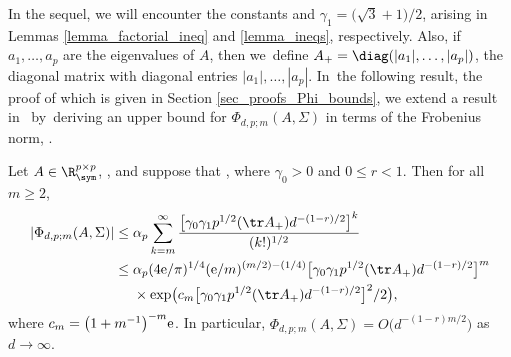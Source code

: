 In the sequel, we will encounter the constants  and $\gamma_1 = \bigl(\sqrt{3}+1\bigr)/2$, arising in Lemmas \ref{lemma_factorial_ineq} and \ref{lemma_ineqs}, respectively. Also, if $a_1,\ldots,a_p$ are the eigenvalues of $A$, then we~define $A_+ = \diag(|a_1|,\ldots,|a_p|)$, the diagonal matrix with diagonal entries $|a_1|,\ldots,|a_p|$. In~the following result, the proof of which is given in Section \ref{sec_proofs_Phi_bounds}, we extend a result in~\cite{BagyanRichards} by~deriving an upper bound for $\Phi_{d,p;m}(A,\Sigma)$ in terms of the Frobenius norm, .

\begin{Theorem}
\label{thm_Phi_m_bound_Bingham}
Let $A \in \R^{p \times p}_\sym$, , and suppose that , where $\gamma_0 > 0$ and $0 \le r < 1$. Then for all $m \ge 2$,
\begin{align}
|\Phi_{d,p;m}(A,\Sigma)| \le{}& \alpha_p \sum_{k=m}^\infty \frac{\bigl[\gamma_0 \gamma_1 p^{1/2} (\tr A_+) d^{-(1-r)/2}\bigr]^k}{(k!)^{1/2}} \label{eq_Phi_m_bound} \\
\le{}& \alpha_p (4 {\rm e}/\pi)^{1/4} ({\rm e}/m)^{(m/2)-(1/4)}
\bigl[\gamma_0 \gamma_1 p^{1/2} (\tr A_+) d^{-(1-r)/2}\bigr]^m \nonumber \\
& \times \exp\bigl(c_m \bigl[\gamma_0 \gamma_1 p^{1/2} (\tr A_+) d^{-(1-r)/2}\bigr]^2/2\bigr), \label{eq_Phi_m_boundw}
\end{align}
where $c_m = \bigl(1+m^{-1}\bigr)^{-m} {\rm e}$. In particular, $\Phi_{d,p;m}(A,\Sigma) = O\bigl(d^{-(1-r)m/2}\bigr)$ as $d \to \infty$.
\end{Theorem}
